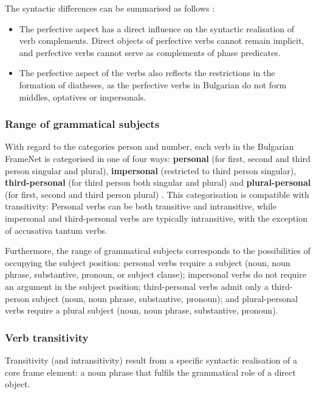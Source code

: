 \documentclass[output=paper,colorlinks,citecolor=brown]{langscibook}
\begin{document}
The syntactic differences can be summarised as follows \citep[56]{Koeva2022}:

\begin{itemize}

\item The perfective aspect has a direct influence on the syntactic realisation of verb complements. Direct objects of perfective verbs cannot remain implicit, and perfective verbs cannot serve as complements of phase predicates.

\item The perfective aspect of the verbs also reflects the restrictions in the formation of diatheses, as the perfective verbs in Bulgarian do not form middles, optatives or impersonals.

\end{itemize}

\subsubsection{Range of grammatical subjects}

With regard to the categories person and number, each verb in the Bulgarian FrameNet is categorised in one of four ways: \textbf{personal} (for first, second and third person singular and plural), \textbf{impersonal} (restricted to third person singular), \textbf{third-personal} (for third person both singular and plural) and \textbf{plural-personal} (for first, second and third person plural) \citep[33]{Koeva2010}. This categorisation is compatible with transitivity: Personal verbs can be both transitive and intransitive, while impersonal and third-personal verbs are typically intransitive, with the exception of accusativa tantum verbs.

Furthermore, the range of grammatical subjects corresponds to the possibilities of occupying the subject position: personal verbs require a subject (noun, noun phrase, substantive, pronoun, or subject clause); impersonal verbs do not require an argument in the subject position; third-personal verbs admit only a third-person subject (noun, noun phrase, substantive, pronoun); and plural-personal verbs require a plural subject (noun, noun phrase, substantive, pronoun).

\subsubsection{Verb transitivity}

Transitivity (and intransitivity) result from a specific syntactic realisation of a core frame element: a noun phrase that fulfils the grammatical role of a direct object.
\end{document}
